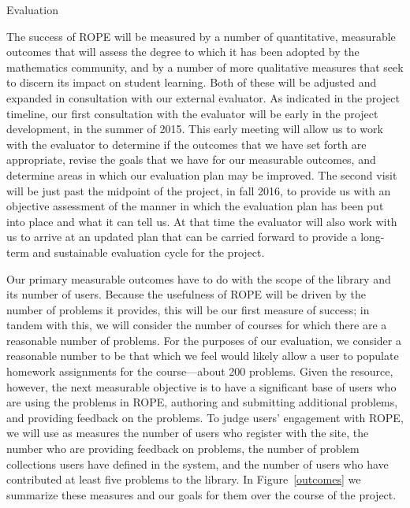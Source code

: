 \documentclass[11pt]{article}
\begin{document}
\begin{section}{Evaluation}

The success of ROPE will be measured by a number of quantitative,
measurable outcomes that will assess the degree to which it has been
adopted by the mathematics community, and by a number of more qualitative
measures that seek to discern its impact on student learning.  Both of
these will be adjusted and expanded in consultation with our external
evaluator.  As indicated in the project timeline, our first consultation
with the evaluator will be early in the project development, in the summer
of 2015.  This early meeting will allow us to work with the evaluator to
determine if the outcomes that we have set forth are appropriate, revise
the goals that we have for our measurable outcomes, and determine areas in
which our evaluation plan may be improved.  The second visit will be just
past the midpoint of the project, in fall 2016, to provide us with an
objective assessment of the manner in which the evaluation plan has been
put into place and what it can tell us.  At that time the evaluator will
also work with us to arrive at an updated plan that can be carried forward
to provide a long-term and sustainable evaluation cycle for the project.

Our primary measurable outcomes have to do with the scope of the library
and its number of users.  Because the usefulness of ROPE will be driven
by the number of problems it provides, this will be our first measure of
success; in tandem with this, we will consider the number of courses for
which there are a reasonable number of problems.  For the purposes of our
evaluation, we consider a reasonable number to be that which we feel would
likely allow a user to populate homework assignments for the
course---about 200 problems.  Given the resource, however, the next
measurable objective is to have a significant base of users who are using
the problems in ROPE, authoring and submitting additional problems, and
providing feedback on the problems.  To judge users' engagement with ROPE, we will use as measures the number of users who register with the
site, the number who are providing feedback on problems, the number of
problem collections users have defined in the system, and the number of
users who have contributed at least five problems to the library.  In
Figure~\ref{outcomes} we summarize these measures and our goals for them
over the course of the project.


\end{section}
\end{document}
